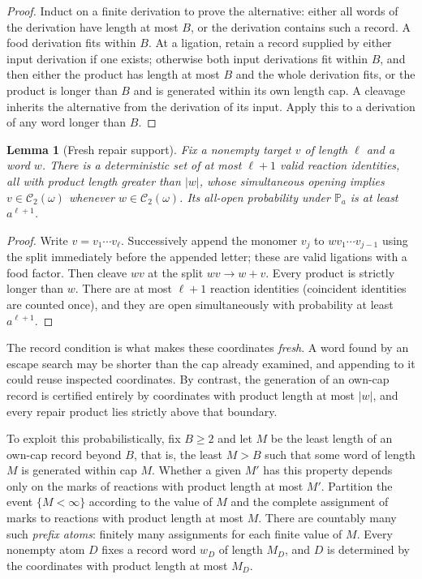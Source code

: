 \documentclass[11pt,reqno]{amsart}
\theoremstyle{plain}
\newtheorem{lemma}[theorem]{Lemma}
\theoremstyle{definition}
\theoremstyle{remark}
\numberwithin{equation}{section}
\newcommand{\Prob}{\mathbb{P}}
\newcommand{\cC}{\mathcal{C}}
\begin{document}
\begin{proof}
Induct on a finite derivation to prove the alternative: either all words of the derivation have length at most $B$, or the derivation contains such a record. A food derivation fits within $B$. At a ligation, retain a record supplied by either input derivation if one exists; otherwise both input derivations fit within $B$, and then either the product has length at most $B$ and the whole derivation fits, or the product is longer than $B$ and is generated within its own length cap. A cleavage inherits the alternative from the derivation of its input. Apply this to a derivation of any word longer than $B$.
\end{proof}

\begin{lemma}[Fresh repair support]\label{lem:repair}
Fix a nonempty target $v$ of length $\ell$ and a word $w$. There is a deterministic set of at most $\ell+1$ valid reaction identities, all with product length greater than $|w|$, whose simultaneous opening implies $v\in\cC_2(\omega)$ whenever $w\in\cC_2(\omega)$. Its all-open probability under $\Prob_a$ is at least $a^{\ell+1}$.
\end{lemma}

\begin{proof}
Write $v=v_1\cdots v_\ell$. Successively append the monomer $v_j$ to $wv_1\cdots v_{j-1}$ using the split immediately before the appended letter; these are valid ligations with a food factor. Then cleave $wv$ at the split $wv\to w+v$. Every product is strictly longer than $w$. There are at most $\ell+1$ reaction identities (coincident identities are counted once), and they are open simultaneously with probability at least $a^{\ell+1}$.
\end{proof}

The record condition is what makes these coordinates \emph{fresh}. A word found by an escape search may be shorter than the cap already examined, and appending to it could reuse inspected coordinates. By contrast, the generation of an own-cap record is certified entirely by coordinates with product length at most $|w|$, and every repair product lies strictly above that boundary.

To exploit this probabilistically, fix $B\ge2$ and let $M$ be the least length of an own-cap record beyond $B$, that is, the least $M>B$ such that some word of length $M$ is generated within cap $M$. Whether a given $M'$ has this property depends only on the marks of reactions with product length at most $M'$. Partition the event $\{M<\infty\}$ according to the value of $M$ and the complete assignment of marks to reactions with product length at most $M$. There are countably many such \emph{prefix atoms}: finitely many assignments for each finite value of $M$. Every nonempty atom $D$ fixes a record word $w_D$ of length $M_D$, and $D$ is determined by the coordinates with product length at most $M_D$.
\end{document}
